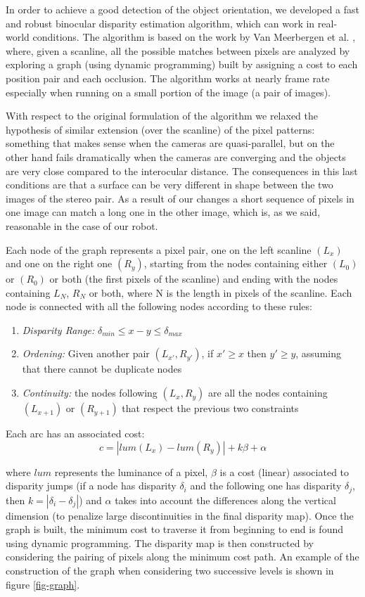 In order to achieve a good detection of the object orientation, we developed a fast and robust binocular disparity estimation algorithm, which can work in real-world conditions.
The algorithm is based on the work by Van Meerbergen et al. \cite{merrbergen02stereo}, where, given a scanline, all the possible matches between pixels are analyzed by exploring a graph (using dynamic programming) built by assigning a cost to each position pair and each occlusion. The algorithm works at nearly frame rate especially when running on a small portion of the image (a pair of images). 

With respect to the original formulation of the algorithm we relaxed the hypothesis of similar extension (over the scanline) of the pixel patterns: something that makes sense when the cameras are quasi-parallel, but on the other hand fails dramatically when the cameras are converging and the objects are very close compared to the interocular distance.
The consequences in this last conditions are that a surface can be very different in shape between the two images of the stereo pair. As a result of our changes a short sequence of pixels in one image can match a long one in the other image, which is, as we said, reasonable in the case of our robot.

Each node of the graph represents a pixel pair, one on the left scanline $(L_x)$ and one on the right one $(R_y)$, starting from the nodes containing either $(L_0)$ or $(R_0)$ or both (the first pixels of the scanline) and ending with the nodes containing ${L_N}$, ${R_N}$ or both, where N is the length in pixels of the scanline. Each node is connected with all the following nodes according to these rules:

\begin{enumerate}
	\item \textit{Disparity Range:} $\delta_{min}\leq x-y \leq \delta_{max}$
	\item \textit{Ordening:} Given another pair $(L_{x'},R_{y'})$, if $x'\geq x$ then $y'\geq y$, assuming that there cannot be duplicate nodes
	\item \textit{Continuity:} the nodes following $(L_x,R_y)$ are all the nodes containing $(L_{x+1})$ or $(R_{y+1})$ that respect the previous two constraints
\end{enumerate}

Each arc has an associated cost:
	\[c=\left|lum(L_x)-lum(R_y)\right|+k\beta+\alpha
\]

\noindent where $lum$ represents the luminance of a pixel, $\beta$ is a cost (linear) associated to disparity jumps (if a node has disparity $\delta_i$ and the following one has disparity $\delta_j$, then $k=|\delta_i-\delta_j|$) and $\alpha$ takes into account the differences along the vertical dimension (to penalize large discontinuities in the final disparity map). Once the graph is built, the minimum cost to traverse it from beginning to end is found using dynamic programming. The disparity map is then constructed by considering the pairing of pixels along the minimum cost path. An example of the construction of the graph when considering two successive levels is shown in figure \ref{fig-graph}.

